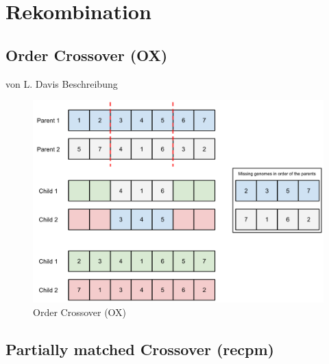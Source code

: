 \section{Rekombination}\label{recombination}


\subsection{Order Crossover (OX)} von L. Davis
Beschreibung

\begin{figure}[h!]
  \centering
  \includegraphics[width=1.0\textwidth]{Figures/recox.pdf}
  \caption{Order Crossover (OX)}\label{fig.recox}
\end{figure}


\subsection{Partially matched Crossover (recpm)}

